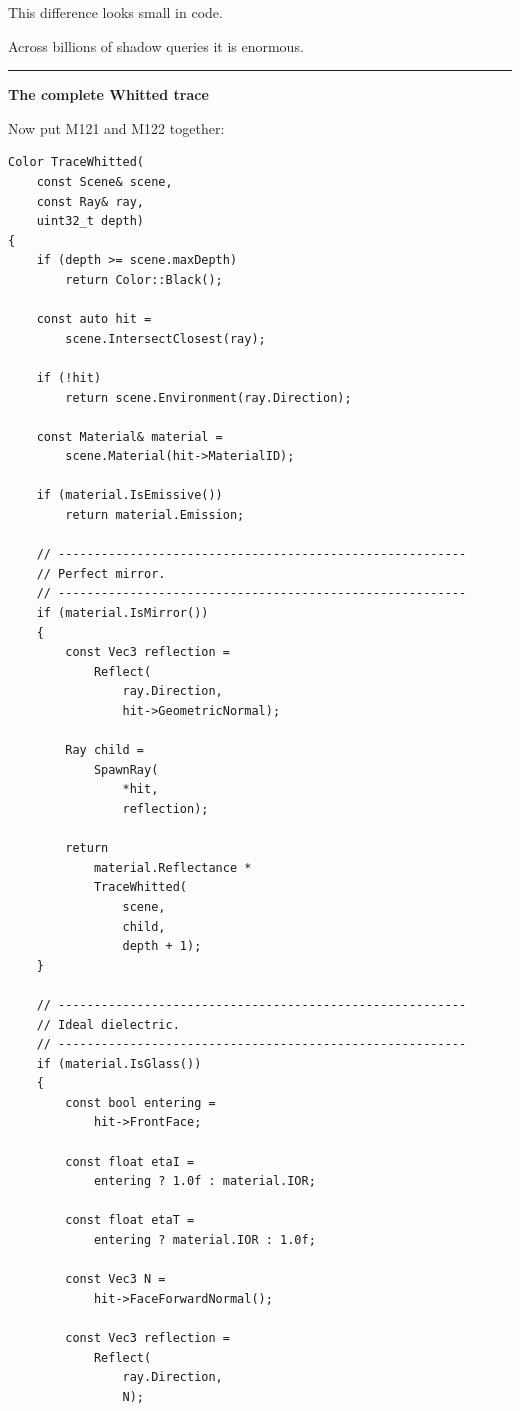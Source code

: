 This difference looks small in code.

Across billions of shadow queries it is enormous.

\begin{center}\rule{0.5\linewidth}{0.5pt}\end{center}

\textbf{The complete Whitted trace}

Now put M121 and M122 together:

\begin{verbatim}
Color TraceWhitted(
    const Scene& scene,
    const Ray& ray,
    uint32_t depth)
{
    if (depth >= scene.maxDepth)
        return Color::Black();

    const auto hit =
        scene.IntersectClosest(ray);

    if (!hit)
        return scene.Environment(ray.Direction);

    const Material& material =
        scene.Material(hit->MaterialID);

    if (material.IsEmissive())
        return material.Emission;

    // ---------------------------------------------------------
    // Perfect mirror.
    // ---------------------------------------------------------
    if (material.IsMirror())
    {
        const Vec3 reflection =
            Reflect(
                ray.Direction,
                hit->GeometricNormal);

        Ray child =
            SpawnRay(
                *hit,
                reflection);

        return
            material.Reflectance *
            TraceWhitted(
                scene,
                child,
                depth + 1);
    }

    // ---------------------------------------------------------
    // Ideal dielectric.
    // ---------------------------------------------------------
    if (material.IsGlass())
    {
        const bool entering =
            hit->FrontFace;

        const float etaI =
            entering ? 1.0f : material.IOR;

        const float etaT =
            entering ? material.IOR : 1.0f;

        const Vec3 N =
            hit->FaceForwardNormal();

        const Vec3 reflection =
            Reflect(
                ray.Direction,
                N);


\end{verbatim}
